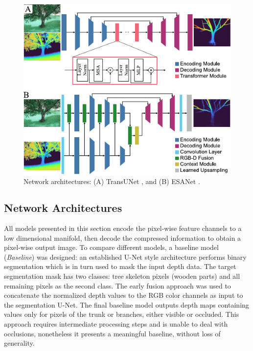\begin{figure}[!t]
\centering
\includegraphics[width=1\columnwidth]{chapters/papers/OBR/figures/fig-2-networks/fig-2-networks-v02.pdf}
\vspace{\figurevspaceabove}
\caption{Network architectures: (A) TransUNet \cite{Chen2021c}, and (B) ESANet \cite{Seichter2021}.}
\label{fig-2-networks}
\vspace{\figurevspacebelow}
\end{figure}

\subsection{Network Architectures}
\label{sec:models}
All models presented in this section encode the pixel-wise feature channels to a low dimensional manifold, then decode the compressed information to obtain a pixel-wise output image. 
To compare different models, a baseline model (\textit{Baseline}) was designed: an established U-Net style architecture \cite{ronneberger2015u} performs binary segmentation which is in turn used to mask the input depth data. The target segmentation mask has two classes: tree skeleton pixels (wooden parts) and all remaining pixels as the second class. The early fusion approach was used to concatenate the normalized depth values to the RGB color channels as input to the segmentation U-Net. The final baseline model outputs depth maps containing values only for pixels of the trunk or branches, either visible or occluded. This approach requires intermediate processing steps and is unable to deal with occlusions, nonetheless it presents a meaningful baseline, without loss of generality.

